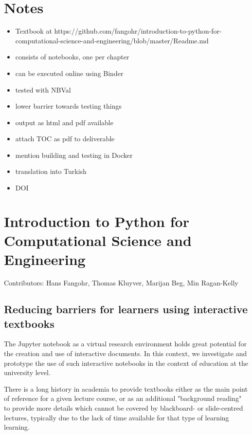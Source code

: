 \documentclass{deliverablereport}
\author{Marcin Kostur et al.}
\begin{document}
\maketitle
\githubissuedescription
\newpage
\tableofcontents
\newpage

\section{Notes}

\begin{itemize}
\item Textbook at https://github.com/fangohr/introduction-to-python-for-computational-science-and-engineering/blob/master/Readme.md
  \item consists of notebooks, one per chapter
\item can be executed online using Binder
\item tested with NBVal
\item lower barrier towards testing things
\item output as html and pdf available

\item attach TOC as pdf to deliverable

\item mention building and testing in Docker
\item translation into Turkish
\item DOI
\end{itemize}

\section{Introduction to Python for Computational Science and Engineering}

Contributors: Hans Fangohr, Thomas Kluyver, Marijan Beg, Min Ragan-Kelly

\subsection{Reducing barriers for learners using interactive textbooks}

The Jupyter notebook as a virtual research environment holds great
potential for the creation and use of interactive documents. In this
context, we investigate and prototype the use of such interactive
notebooks in the context of education at the university level.

There is a long history in academia to provide textbooks either as
the main point of reference for a given lecture course, or as an
additional "background reading" to provide more details which cannot
be covered by blackboard- or slide-centred lectures, typically due to
the lack of time available for that type of learning learning.
\end{document}
